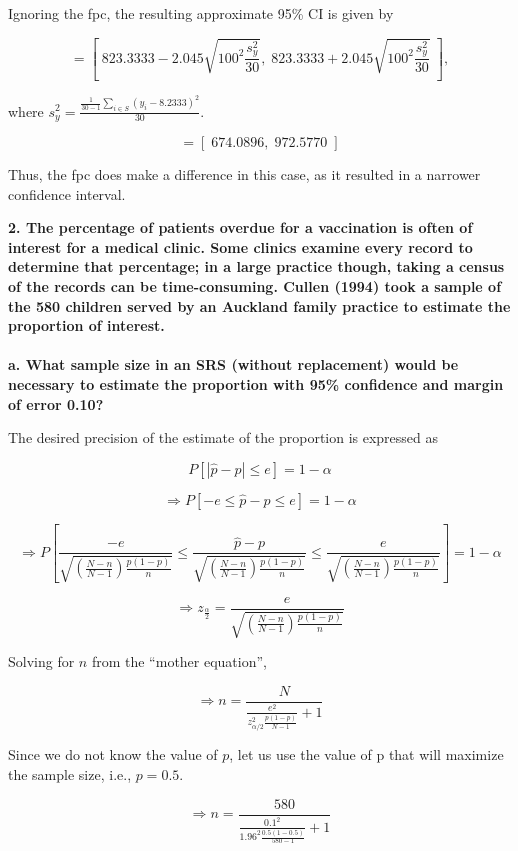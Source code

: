 \documentclass[12pt]{article}
\begin{document}
Ignoring the fpc, the resulting approximate 95\% CI is given by

\[
= \left[\;823.3333- 2.045\sqrt{100^2\frac{s_y^2}{30}},\;823.3333 +2.045\sqrt{100^2\frac{s_y^2}{30}}\;\right],
\]
\begin{center}
where $s_y^2 =\frac{\frac{1}{30-1}\sum_{i \in S}{(y_i-8.2333)^2}}{30}$.
\end{center}

\[
= \boxed{\left[\;674.0896,\;972.5770\;\right]}
\]

Thus, the fpc does make a difference in this case, as it resulted in a
narrower confidence interval. 

\hrulefill

\textbf{2. The percentage of patients overdue for a vaccination
is often of interest for a medical clinic. Some clinics examine every
record to determine that percentage; in a large practice though, taking
a census of the records can be time-consuming. Cullen (1994) took a
sample of the 580 children served by an Auckland family practice to
estimate the proportion of
interest.} \\
\\
\textbf{a. What sample size in an SRS (without replacement) would be
necessary to estimate the proportion with 95\% confidence and margin of error 0.10?}

The desired precision of the estimate of the proportion is expressed as

\[
P\left[|\hat p - p| \leq e\right] = 1-\alpha
\]

\[
\Rightarrow P\left[-e \leq \hat p - p \leq e\right] = 1-\alpha
\]

\[
\Rightarrow P\left[\frac{-e}{\sqrt{\left(\frac{N-n}{N-1}\right)\frac{p(1-p)}{n}}} \leq \frac{\hat p - p}{\sqrt{\left(\frac{N-n}{N-1}\right)\frac{p(1-p)}{n}}} \leq \frac{e}{\sqrt{\left(\frac{N-n}{N-1}\right)\frac{p(1-p)}{n}}}\right]=1-\alpha
\]

\[
\Rightarrow z_{\frac{\alpha}{2}} = \frac{e}{\sqrt{\left(\frac{N-n}{N-1}\right)\frac{p(1-p)}{n}}}
\]

Solving for \(n\) from the ``mother equation'',

\[
\Rightarrow n = \frac{N}{\frac{e^2}{{z_{\alpha/2}^2}\frac{p(1-p)}{N-1}} + 1}
\]

Since we do not know the value of \(p\), let us use the value of p that
will maximize the sample size, i.e., \(p=0.5\).

\[
\Rightarrow n = \frac{580}{\frac{0.1^2}{{1.96^2}\frac{0.5(1-0.5)}{580-1}} + 1}
\]
\end{document}

